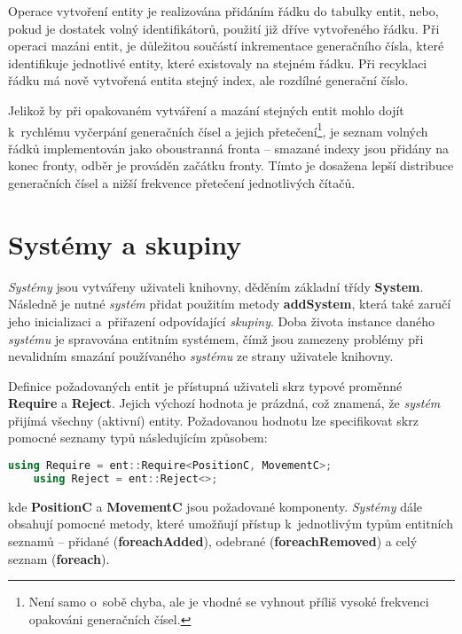 Operace vytvoření entity je realizována přidáním řádku do tabulky entit, nebo, pokud je dostatek volný identifikátorů, použití již dříve vytvořeného řádku. Při operaci mazáni entit, je důležitou součástí inkrementace generačního čísla, které identifikuje jednotlivé entity, které existovaly na stejném řádku. Při recyklaci řádku má nově vytvořená entita stejný index, ale rozdílné generační číslo. 

Jelikož by při opakovaném vytváření a mazání stejných entit mohlo dojít k~rychlému vyčerpání generačních čísel a jejich přetečení\footnote{Není samo o~sobě chyba, ale je vhodné se vyhnout příliš vysoké frekvenci opakováni generačních čísel.}, je seznam volných řádků implementován jako oboustranná fronta -- smazané indexy jsou přidány na konec fronty, odběr je prováděn začátku fronty. Tímto je dosažena lepší distribuce generačních čísel a nižší frekvence přetečení jednotlivých čítačů.

\section{Systémy a skupiny}
\label{Chap:ImplSystem}

\emph{Systémy} jsou vytvářeny uživateli knihovny, děděním základní třídy \textbf{System}. Následně je nutné \emph{systém} přidat použitím metody \textbf{addSystem}, která také zaručí jeho inicializaci a~přiřazení odpovídající \emph{skupiny}. Doba života instance daného \emph{systému} je spravována entitním systémem, čímž jsou zamezeny problémy při nevalidním smazání používaného \emph{systému} ze strany uživatele knihovny.

Definice požadovaných entit je přístupná uživateli skrz typové proměnné \textbf{Require} a \textbf{Reject}. Jejich výchozí hodnota je prázdná, což znamená, že \emph{systém} přijímá všechny (aktivní) entity. Požadovanou hodnotu lze specifikovat skrz pomocné seznamy typů následujícím způsobem: 

\begin{lstlisting}[language=C++]
	using Require = ent::Require<PositionC, MovementC>;
	using Reject = ent::Reject<>;
\end{lstlisting}

\noindent kde \textbf{PositionC} a \textbf{MovementC} jsou požadované komponenty. \emph{Systémy} dále obsahují pomocné metody, které umožňují přístup k~jednotlivým typům entitních seznamů -- přidané (\textbf{foreachAdded}), odebrané (\textbf{foreachRemoved}) a celý seznam (\textbf{foreach}).

